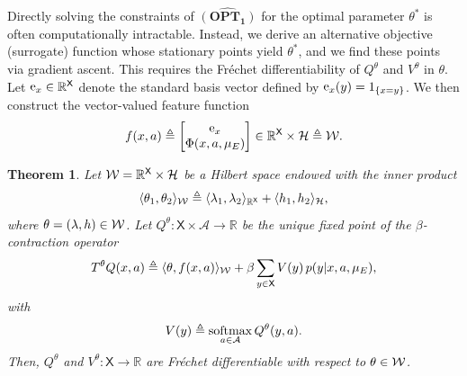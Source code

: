 \documentclass[11pt]{article}
\newcommand{\R}{\mathbb{R}}
\newcommand{\softmax}{\mathop{\rm softmax}}
\newcommand{\ee}{\mathop{\rm e}}
\newcommand{\sX}{{\mathsf X}}
\newcommand{\cH}{{\mathcal H}}
\newtheorem{theorem}{Theorem}[section]
\begin{document}
Directly solving the constraints of \( \mathbf{\widehat{(OPT_1)}} \) for the optimal parameter 
\( \theta^* \) is often computationally intractable.  Instead, we derive an alternative objective (surrogate) function whose stationary points yield \( \theta^* \), and we find these points via gradient ascent. This requires the Fr\'{e}chet differentiability of $Q^{\theta}$ and $V^{\theta}$ in $\theta$. Let  $\ee_x \in \R^{\sX}$ denote the standard basis vector defined by $\ee_x(y) = 1_{\{x=y\}}$. We then construct the vector-valued feature function
$$
f(x,a) \triangleq \begin{bmatrix}
\ee_x \\ \Phi(x,a,\mu_E) 
\end{bmatrix} \in \R^{\sX} \times \cH \triangleq \cal W.
$$
  


\begin{theorem}
Let $\cal W = \mathbb{R}^{\sX} \times \mathcal{H}$ be a Hilbert space endowed with the inner product
\[
\langle \theta_1, \theta_2 \rangle_{\cal W} \triangleq 
\langle \lambda_1, \lambda_2 \rangle_{\mathbb{R}^{\sX}} + \langle h_1, h_2 \rangle_{\mathcal{H}},
\]
where $\theta = (\lambda,h) \in \cal W$. Let $Q^{\theta}: \sX \times \mathcal{A} \to \mathbb{R}$ be the unique fixed point of the $\beta$-contraction operator
\[
T^{\theta} Q(x,a) \triangleq \langle \theta, f(x,a) \rangle_{\cal W} + \beta \sum_{y \in \sX} V(y) \, p(y|x,a,\mu_E),
\]
with
\[
V(y) \triangleq \softmax_{a \in \mathcal{A}} Q^{\theta}(y,a).
\]
Then, $Q^{\theta}$ and $V^{\theta}: \sX \to \mathbb{R}$ are Fr\'echet differentiable with respect to $\theta \in \cal W$.
\end{theorem}
\end{document}
